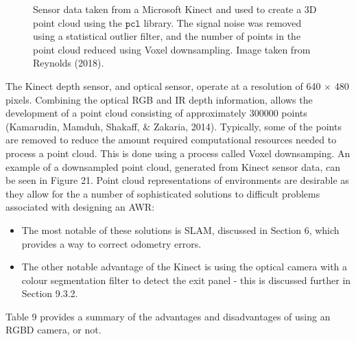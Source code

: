 \documentclass[a4paper]{article}
\begin{document}
\begin{figure}[h]
\begin{minipage}{0.45\textwidth}
\caption{Sensor data taken from a Microsoft Kinect and used to create a 3D point cloud using the $\texttt{pcl}$ library. The signal noise was removed using a statistical outlier filter, and the number of points in the point cloud reduced using Voxel downsampling. Image taken from Reynolds (2018).}
\end{minipage}
\end{figure}

The Kinect depth sensor, and optical sensor, operate at a resolution of 640 $\times$ 480 pixels. Combining the optical RGB and IR depth information, allows the development of a point cloud consisting of approximately 300000 points (Kamarudin, Mamduh, Shakaff, \& Zakaria, 2014). Typically, some of the points are removed to reduce the amount required computational resources needed to process a point cloud. This is done using a process called Voxel downsamping. An example of a downsampled point cloud, generated from Kinect sensor data, can be seen in Figure 21. Point cloud representations of environments are desirable as they allow for the a number of sophisticated solutions to difficult problems associated with designing an AWR:
\begin{itemize}
\item The most notable of these solutions is SLAM, discussed in Section 6, which provides a way to correct odometry errors.
\item The other notable advantage of the Kinect is using the optical camera with a colour segmentation filter to detect the exit panel - this is discussed further in Section 9.3.2.  
\end{itemize}

Table 9 provides a summary of the advantages and disadvantages of using an RGBD camera, or not. 
\end{document}
